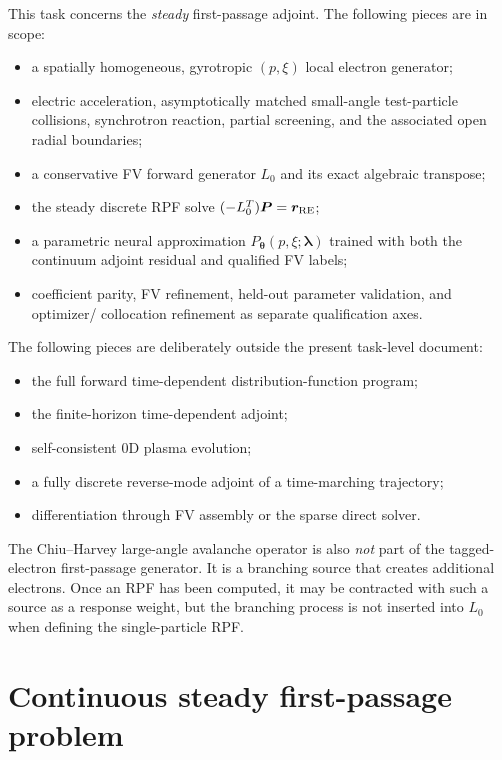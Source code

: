 \documentclass[11pt]{article}
\newcommand{\Pvec}{\bm P}
\newcommand{\rRE}{\bm r_{\rm RE}}
\newcommand{\lam}{\bm\lambda}
\newcommand{\thetaNN}{\bm\theta}
\begin{document}
This task concerns the \emph{steady} first-passage adjoint.  The following pieces are in
scope:
\begin{itemize}[leftmargin=2em]
 \item a spatially homogeneous, gyrotropic $(p,\xi)$ local electron generator;
 \item electric acceleration, asymptotically matched small-angle test-particle collisions,
       synchrotron reaction, partial screening, and the associated open radial boundaries;
 \item a conservative FV forward generator $L_0$ and its exact algebraic transpose;
 \item the steady discrete RPF solve $(-L_0^T)\Pvec=\rRE$;
 \item a parametric neural approximation $P_{\thetaNN}(p,\xi;\lam)$ trained with both the
       continuum adjoint residual and qualified FV labels;
 \item coefficient parity, FV refinement, held-out parameter validation, and optimizer/
       collocation refinement as separate qualification axes.
\end{itemize}

The following pieces are deliberately outside the present task-level document:
\begin{itemize}[leftmargin=2em]
 \item the full forward time-dependent distribution-function program;
 \item the finite-horizon time-dependent adjoint;
 \item self-consistent 0D plasma evolution;
 \item a fully discrete reverse-mode adjoint of a time-marching trajectory;
 \item differentiation through FV assembly or the sparse direct solver.
\end{itemize}

The Chiu--Harvey large-angle avalanche operator is also \emph{not} part of the tagged-
electron first-passage generator.  It is a branching source that creates additional
electrons.  Once an RPF has been computed, it may be contracted with such a source as a
response weight, but the branching process is not inserted into $L_0$ when defining the
single-particle RPF.

\section{Continuous steady first-passage problem}
\label{sec:continuous_rpf}
\end{document}
